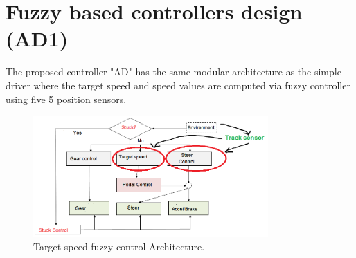 \documentclass{llncs}
\begin{document}
\section{Fuzzy based controllers design (AD1)}
The proposed controller "AD" has the same modular architecture as the simple driver where the target speed  and speed values are  computed via fuzzy controller using five 5 position sensors.



\begin{figure}[h!]
	
	\centering
	\includegraphics[width=0.8\textwidth]{fig/speedcible3.PNG}
	\begin{minipage}{10cm}
		\centering
		\caption{\footnotesize Target speed fuzzy control Architecture.}
		\label{archi2}
	\end{minipage} 
\end{figure}
\end{document}
